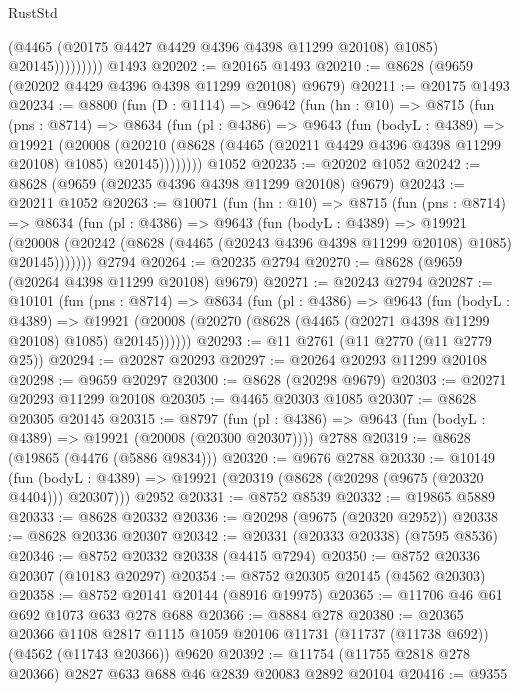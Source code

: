 \begin{lexlean}{RustStd}
\begin{coremodule}
                      (@4465 (@20175 @4427 @4429 @4396 @4398 @11299 @20108) @1085)
                      @20145)))))))))
    @1493
@20202 := @20165 @1493
@20210 := @8628 (@9659 (@20202 @4429 @4396 @4398 @11299 @20108) @9679)
@20211 := @20175 @1493
@20234 := @8800
    (fun (D : @1114) =>
    @9642
      (fun (hn : @10) =>
      @8715
        (fun (pns : @8714) =>
        @8634
          (fun (pl : @4386) =>
          @9643
            (fun (bodyL : @4389) =>
            @19921
              (@20008
                (@20210 (@8628 (@4465 (@20211 @4429 @4396 @4398 @11299 @20108) @1085) @20145))))))))
    @1052
@20235 := @20202 @1052
@20242 := @8628 (@9659 (@20235 @4396 @4398 @11299 @20108) @9679)
@20243 := @20211 @1052
@20263 := @10071
    (fun (hn : @10) =>
    @8715
      (fun (pns : @8714) =>
      @8634
        (fun (pl : @4386) =>
        @9643
          (fun (bodyL : @4389) =>
          @19921
            (@20008 (@20242 (@8628 (@4465 (@20243 @4396 @4398 @11299 @20108) @1085) @20145)))))))
    @2794
@20264 := @20235 @2794
@20270 := @8628 (@9659 (@20264 @4398 @11299 @20108) @9679)
@20271 := @20243 @2794
@20287 := @10101
    (fun (pns : @8714) =>
    @8634
      (fun (pl : @4386) =>
      @9643
        (fun (bodyL : @4389) =>
        @19921 (@20008 (@20270 (@8628 (@4465 (@20271 @4398 @11299 @20108) @1085) @20145))))))
@20293 := @11 @2761 (@11 @2770 (@11 @2779 @25))
@20294 := @20287 @20293
@20297 := @20264 @20293 @11299 @20108
@20298 := @9659 @20297
@20300 := @8628 (@20298 @9679)
@20303 := @20271 @20293 @11299 @20108
@20305 := @4465 @20303 @1085
@20307 := @8628 @20305 @20145
@20315 := @8797
    (fun (pl : @4386) => @9643 (fun (bodyL : @4389) => @19921 (@20008 (@20300 @20307))))
    @2788
@20319 := @8628 (@19865 (@4476 (@5886 @9834)))
@20320 := @9676 @2788
@20330 := @10149
    (fun (bodyL : @4389) => @19921 (@20319 (@8628 (@20298 (@9675 (@20320 @4404))) @20307)))
    @2952
@20331 := @8752 @8539
@20332 := @19865 @5889
@20333 := @8628 @20332
@20336 := @20298 (@9675 (@20320 @2952))
@20338 := @8628 @20336 @20307
@20342 := @20331 (@20333 @20338) (@7595 @8536)
@20346 := @8752 @20332 @20338 (@4415 @7294)
@20350 := @8752 @20336 @20307 (@10183 @20297)
@20354 := @8752 @20305 @20145 (@4562 @20303)
@20358 := @8752 @20141 @20144 (@8916 @19975)
@20365 := @11706 @46 @61 @692 @1073 @633 @278 @688
@20366 := @8884 @278
@20380 := @20365
    @20366
    @1108
    @2817
    @1115
    @1059
    @20106
    @11731
    (@11737 (@11738 @692))
    (@4562 (@11743 @20366))
    @9620
@20392 := @11754 (@11755 @2818 @278 @20366) @2827 @633 @688 @46 @2839 @20083 @2892 @20104
@20416 := @9355

\end{coremodule}
\end{lexlean}
